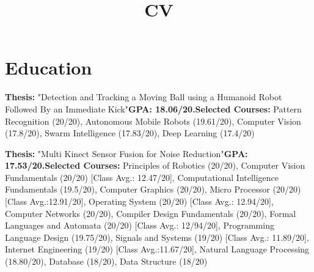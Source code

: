 \documentclass[11pt,a4paper,roman]{moderncv} %
\title{CV}
\begin{document}
\makecvtitle %

\section{Education}

{\textbf{Thesis:} "Detection and Tracking a Moving Ball using a Humanoid Robot Followed By an Immediate Kick"\newline{}\textbf{GPA: 18.06/20.}\newline{}\textbf{Selected Courses:} Pattern Recognition (20/20), Autonomous Mobile Robots (19.61/20), Computer Vision (17.8/20), Swarm Intelligence (17.83/20), Deep Learning (17.4/20) }  %

{\textbf{Thesis:} "Multi Kinect Sensor Fusion for Noise Reduction"\newline{}\textbf{GPA: 17.53/20.}\newline{}\textbf{Selected Courses:} Principles of Robotics (20/20), Computer Vision Fundamentals (20/20) [Class Avg.: 12.47/20], Computational Intelligence Fundamentals (19.5/20), Computer Graphics (20/20), Micro Processor (20/20) [Class Avg.:12.91/20], Operating System (20/20) [Class Avg.: 12.94/20], Computer Networks (20/20), Compiler Design Fundamentals (20/20), Formal Languages and Automata (20/20) [Class Avg.: 12/94/20], Programming Language Design (19.75/20), Signals and Systems (19/20) [Class Avg.: 11.89/20], Internet Engineering (19/20) [Class Avg.:11.67/20], Natural Language Processing (18.80/20), Database (18/20), Data Structure (18/20)} 


\end{document}
